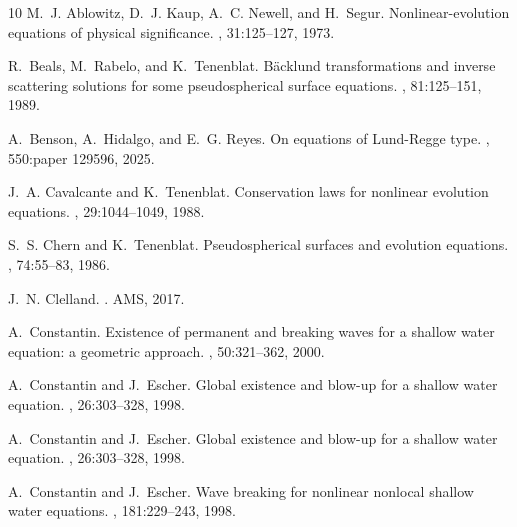 \documentclass{cimart}
\begin{document}
{\small
    \begin{thebibliography}{10}
        M.~J. Ablowitz, D.~J. Kaup, A.~C. Newell, and H.~Segur.
        \newblock Nonlinear-evolution equations of physical significance.
        , 31:125--127, 1973.
        
        R.~Beals, M.~Rabelo, and K.~Tenenblat.
        \newblock Bäcklund transformations and inverse scattering solutions for some
          pseudospherical surface equations.
        , 81:125--151, 1989.
        
        A.~Benson, A.~Hidalgo, and E.~G. Reyes.
        \newblock On equations of {L}und-{R}egge type.
        , 550:paper 129596, 2025.
        
        J.~A. Cavalcante and K.~Tenenblat.
        \newblock Conservation laws for nonlinear evolution equations.
        , 29:1044--1049, 1988.
        
        S.~S. Chern and K.~Tenenblat.
        \newblock Pseudospherical surfaces and evolution equations.
        , 74:55--83, 1986.
        
        J.~N. Clelland.
        .
        \newblock AMS, 2017.
        
        A.~Constantin.
        \newblock Existence of permanent and breaking waves for a shallow water
          equation: a geometric approach.
        , 50:321--362, 2000.
        
        A.~Constantin and J.~Escher.
        \newblock Global existence and blow-up for a shallow water equation.
        , 26:303--328, 1998.
        
        A.~Constantin and J.~Escher.
        \newblock Global existence and blow-up for a shallow water equation.
        , 26:303--328, 1998.
        
        A.~Constantin and J.~Escher.
        \newblock Wave breaking for nonlinear nonlocal shallow water equations.
        , 181:229--243, 1998.
        

\end{thebibliography}}
\end{document}
